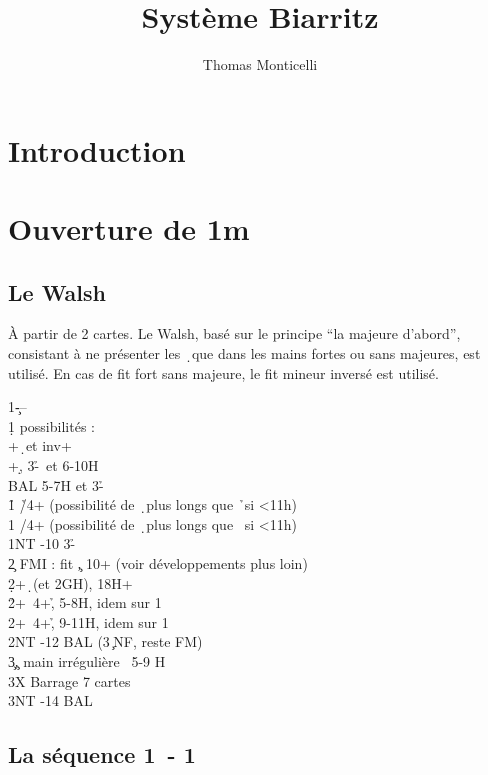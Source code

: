\documentclass[a4paper]{article}
\title{Système Biarritz}
\author{Thomas Monticelli}
\begin{document}
\maketitle
\tableofcontents

\section{Introduction}

\section{Ouverture de 1m}

\subsection{Le Walsh}

À partir de 2 cartes. Le Walsh, basé sur le principe ``la majeure d'abord'', consistant à ne présenter les \d\ que dans les mains fortes ou sans majeures, est utilisé.
En cas de fit fort sans majeure, le fit mineur inversé est utilisé.

\begin{bidtable}
1\c---\\
1\d {} possibilités :\\
+\d\ et inv+\\
+\d , 3-\h \s\ et 6-10H\\
\>BAL 5-7H et 3-\h \s \\
1\h \> \h /4+ (possibilité de \d\ plus longs que \h\ si <11h)\\
1\s \> \s /4+ (possibilité de \d\ plus longs que \s\ si <11h)\\
1NT -10 3-\h \s \\
2\c \> FMI : fit \c , 10+ (voir développements plus loin)\\
2\d {}+\d\ (et 2GH), 18H+\\
2\h {}+\s\ 4+\h , 5-8H, idem sur 1\d \\
2\s {}+\s\ 4+\h , 9-11H, idem sur 1\d \\
2NT	 -12 BAL (3\c\ NF, reste FM)\\
3\c	 {}\c , main irrégulière ~5-9 H\\
3X	 \> Barrage 7 cartes\\
3NT	 -14 BAL
\end{bidtable}

\subsection{La séquence 1\pdfc\ - 1\pdfd}
\end{document}
